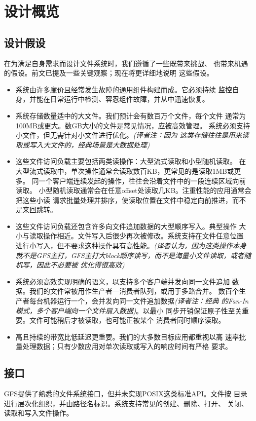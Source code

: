 \section{设计概览}

\subsection{设计假设}
在为满足自身需求而设计文件系统时，我们遵循了一些既带来挑战、
也带来机遇的假设。前文已提及一些关键观察；现在将更详细地说明
这些假设。

\begin{itemize}
  \item 系统由许多廉价且经常发生故障的通用组件构建而成。它必须持续
  监控自身，并能在日常运行中检测、容忍组件故障，并从中迅速恢复。
  \item 系统存储数量适中的大文件。我们预计会有数百万个文件，每个文件
  通常为100MB或更大。数GB大小的文件是常见情况，应被高效管理。
  系统必须支持小文件，但无需针对小文件进行优化。\emph{(译者注：因为
  这类存储往往是用来读取或写入大文件的，经典场景是大数据处理)}
  \item 这些文件访问负载主要包括两类读操作：大型流式读取和小型随机读取。
  在大型流式读取中，单次操作通常会读取数百KB，更常见的是读取1MB或更多。
  同一个客户端连续发起的操作，往往会沿着文件中的一段连续区域向前读取。
  小型随机读取通常会在任意offset处读取几KB。注重性能的应用通常会把这些小读
  请求批量处理并排序，使读取位置在文件中稳定向前推进，而不是来回跳转。
  \item 这些文件访问负载还包含许多向文件追加数据的大型顺序写入。典型操作
  大小与读取操作相近。文件写入后很少再次被修改。系统支持在文件任意位置
  进行小写入，但不要求这种操作具有高性能。\emph{(译者认为，因为这类操作本身
  就不是GFS主打，GFS主打大block顺序读写，而不是海量小文件读取，或者随机写，因此不必要被
  优化得很高效)}
  \item 系统必须高效实现明确的语义，以支持多个客户端并发向同一文件追加
  数据。我们的文件常被用作生产者—消费者队列，或用于多路合并。
  数百个生产者每台机器运行一个，会并发向同一文件追加数据\emph{(译者注：经典
  的Fan-In模式，多个客户端向一个文件扇入数据)}。以最小
  同步开销保证原子性至关重要。文件可能稍后才被读取，也可能正被某个
  消费者同时顺序读取。
  \item 高且持续的带宽比低延迟更重要。我们的大多数目标应用都重视以高
  速率批量处理数据；只有少数应用对单次读取或写入的响应时间有严格
  要求。
\end{itemize}

\subsection{接口}
GFS提供了熟悉的文件系统接口，但并未实现POSIX这类标准API。文件按
目录进行层次化组织，并由路径名标识。系统支持常见的创建、删除、打开、
关闭、读取和写入文件操作。


